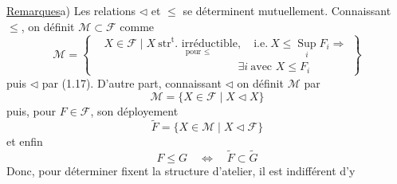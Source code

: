 \uline{Remarques}\quad a) Les relations $\triangleleft$ et $\leq$ se déterminent mutuellement. Connaissant $\leq$, on définit $\mathcal{M}\subset\mathcal{F}$ comme
\[
\mathcal{M}=\left\{\begin{aligned}
&X\in\mathcal{F}\mid X\ \underset{\text{pour }\leq}{\text{$\mathrm{str}^{\mathrm{t}}$. irréductible}},\quad\text{i.e.}\ X\leq\mathop{\mathrm{Sup}}\limits_i F_i\Rightarrow\\
&\hspace{12em}\exists i\ \text{avec }X\leq F_i
\end{aligned}\right\}\tag*{(1.20)}
\]
puis $\triangleleft$ par (1.17).
 D'autre part, connaissant $\triangleleft$ on définit $\mathcal{M}$ par
\[
\mathcal{M}=\{X\in\mathcal{F}\mid X\triangleleft X\}\tag*{(1.21)}
\]
puis, pour $F\in\mathcal{F}$, son déployement
\[
\widetilde F=\{X\in\mathcal{M}\mid X\triangleleft\mathcal{F}\}\tag*{(1.22)}
\]
et enfin
\[
F\leq G\quad\Longleftrightarrow\quad\widetilde F\subset\widetilde G\tag*{(1,23)}
\]
Donc, pour déterminer   fixent la structure d'atelier, il est indifférent d'y
